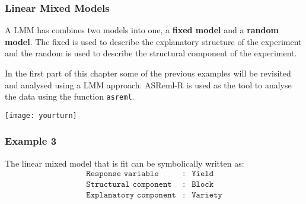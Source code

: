 \begin{frame}\frametitle{Linear Mixed Models}
A LMM has combines two models into one, a \textbf{fixed model} and a \textbf{random model}.
The fixed is used to describe the explanatory structure of the experiment and the random is
used to describe the structural component of the experiment.

\vspace{0.5cm}

In the first part of this chapter some of the previous examples will be revisited and analysed using a LMM approach.
ASReml-R \cite{asremlr} is used as the tool to analyse the data using the function \texttt{asreml}.
\vspace{0.1cm}

\flushright
\texttt{[image: yourturn]}

\end{frame}


\begin{frame}\frametitle{Example 3}
The linear mixed model that is fit can be symbolically written as:
\begin{eqnarray*}
	\texttt{Response variable}&:& \texttt{Yield} \\
	\texttt{Structural component}&:& \texttt{Block}\\
	\texttt{Explanatory component}&:& \texttt{Variety}
\end{eqnarray*}

\end{frame}


\begin{frame}\frametitle{}

\end{frame}


\begin{frame}\frametitle{}

\end{frame}



